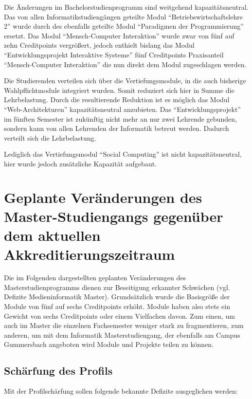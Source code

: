 Die Änderungen im Bachelorstudienprogramm sind weitgehend
kapazitätsneutral. Das von allen Informatikstudiengängen geteilte Modul
``Betriebswirtschaftslehre 2'' wurde durch des ebenfalls geteilte Modul
``Paradigmen der Programmierung'' ersetzt. Das Modul ``Mensch-Computer
Interaktion'' wurde zwar von fünf auf zehn Creditpoints vergrößert,
jedoch enthielt bislang das Modul ``Entwicklungsprojekt Interaktive
Systeme'' fünf Creditpoints Praxisanteil ``Mensch-Computer Interaktion''
die nun direkt dem Modul zugeschlagen werden.

Die Studierenden verteilen sich über die Vertiefungsmodule, in die auch
bisherige Wahlpflichtmodule integriert wurden. Somit reduziert sich hier
in Summe die Lehrbelastung. Durch die resultierende Reduktion ist es
möglich das Modul ``Web-Architekturen'' kapazitätsneutral anzubieten.
Das ``Entwicklungsprojekt'' im fünften Semester ist zukünftig nicht mehr
an nur zwei Lehrende gebunden, sondern kann von allen Lehrenden der
Informatik betreut werden. Dadurch verteilt sich die Lehrbelastung.

Lediglich das Vertiefungsmodul ``Social Computing'' ist nicht
kapazitätsneutral, hier wurde jedoch zusätzliche Kapazität aufgebaut.

\chapter{Geplante Veränderungen des Master-Studiengangs gegenüber dem
aktuellen
Akkreditierungszeitraum}\label{geplante-veruxe4nderungen-des-master-studiengangs-gegenuxfcber-dem-aktuellen-akkreditierungszeitraum}

Die im Folgenden dargestellten geplanten Veränderungen des
Masterstudienprogramms dienen zur Beseitigung erkannter Schwächen (vgl.
Defizite Medieninformatik Master). Grundsätzlich wurde die Basisgröße
der Module von fünf auf sechs Creditpoints erhöht. Module haben also
stets ein Gewicht von sechs Creditpoints oder einem Vielfachen davon.
Zum einen, um auch im Master die einzelnen Fachsemester weniger stark zu
fragmentieren, zum anderen, um mit dem Informatik Masterstudiengang, der
ebenfalls am Campus Gummersbach angeboten wird Module und Projekte
teilen zu können.

\section{Schärfung des Profils}\label{schuxe4rfung-des-profils}

Mit der Profilschärfung sollen folgende bekannte Defizite ausgeglichen
werden:

